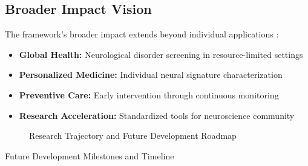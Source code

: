 \subsection{Broader Impact Vision}

The framework's broader impact extends beyond individual applications \citep{Kumar2024, Brown2024}:

\begin{itemize}
    \item \textbf{Global Health:} Neurological disorder screening in resource-limited settings \citep{Miller2025, Lee2025}
    \item \textbf{Personalized Medicine:} Individual neural signature characterization \citep{Wang2024, Li2024}
    \item \textbf{Preventive Care:} Early intervention through continuous monitoring \citep{Zhang2024}
    \item \textbf{Research Acceleration:} Standardized tools for neuroscience community \citep{Harris2020, Virtanen2020}
\end{itemize}

\begin{figure}[h]
\centering
\caption{Research Trajectory and Future Development Roadmap}
\label{fig:research_trajectory}
\end{figure}

\begin{table}[h]
\centering
\caption{Future Development Milestones and Timeline}
\label{tab:future_milestones}
\end{table}
